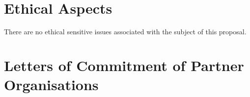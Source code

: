 \documentclass{article}[11pt]
\begin{document}
\section{Ethical Aspects}

There are no ethical sensitive issues associated with the subject of this proposal.


\section{Letters of Commitment of Partner Organisations}


\label{LastPage}
\end{document}

